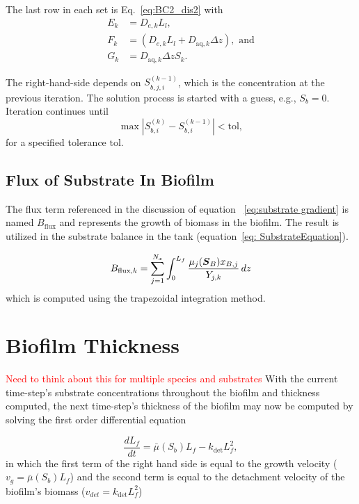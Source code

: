 \documentclass[letterpaper, twoside]{article}
\numberwithin{equation}{section}
\def\bm#1{\mbox{\boldmath{$#1$}}}
\begin{document}
The last row in each set is Eq.~\ref{eq:BC2_dis2} with
\begin{align}
  E_k&=D_{e,k} L_l,\\
  F_k&=\left(D_{e,k} L_l + D_{\mathrm{aq},k} \Delta z\right),\text{ and}\\
  G_k&=D_{\mathrm{aq},k} \Delta z S_k.
\end{align}

The right-hand-side depends on $S_{b,j,i}^{(k-1)}$, which is the concentration at the previous iteration.  The solution process is started with a guess, e.g., $S_b=0$. Iteration continues until
\begin{equation*}
  \max\left| S_{b,i}^{(k)} - S_{b,i}^{(k-1)} \right| < \mathrm{tol},
\end{equation*}
for a specified tolerance $\mathrm{tol}$.

\subsection{Flux of Substrate In Biofilm}
The flux term referenced in the discussion of equation ~\ref{eq:substrate gradient} is named $B_\mathrm{flux}$ and represents the growth of biomass in the biofilm. The result is utilized in the substrate balance in the tank (equation~\ref{eq: SubstrateEquation}).

\begin{equation} \label{eq:Bflux}
  B_{\mathrm{flux},k} = \sum_{j=1}^{N_x} \int_0^{L_f} \frac{\mu_j(\bm{S}_B) x_{B,j}}{Y_{j,k}} \, dz %
\end{equation}
which is computed using the trapezoidal integration method. 

\section{Biofilm Thickness}\textcolor{red}{Need to think about this for multiple species and substrates}
With the current time-step's substrate concentrations throughout the biofilm and thickness computed, the next time-step's thickness of the biofilm may now be computed by solving the first order differential equation

\begin{equation}
  \label{eq:dLfdt_1}
  \frac{d L_f}{dt} = {\bar\mu(S_b) L_f}-{k_{\mathrm{det}}L_f^2},
\end{equation}
in which the first term of the right hand side is equal to the growth velocity ($v_g={\bar\mu(S_b) L_f}$) and the second term is equal to the detachment velocity of the biofilm's biomass ($v_{det}={k_{\mathrm{det}}L_f^2}$)
\end{document}
